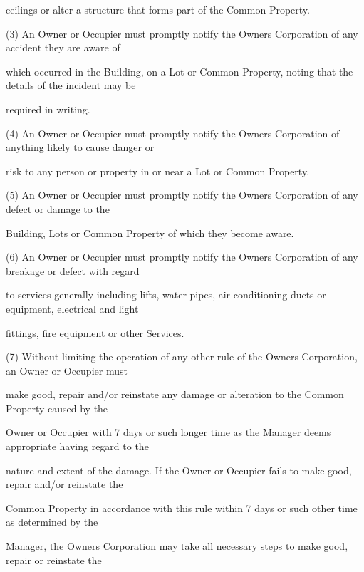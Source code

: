 \documentclass{article}
\begin{document}
{\fontsize{10.02}{1}ceilings or alter a structure that forms part of the Common Property. }

\newpage

{\fontsize{9.962}{1}(3) An Owner or Occupier must promptly notify the Owners Corporation of any accident they are aware of }

{\fontsize{10.02}{1}which occurred in the Building, on a Lot or Common Property, noting that the details of the incident may be }

{\fontsize{10.02}{1}required in writing. }

{\fontsize{9.962}{1}(4) An Owner or Occupier must promptly notify the Owners Corporation of anything likely to cause danger or }

{\fontsize{10.02}{1}risk to any person or property in or near a Lot or Common Property. }

{\fontsize{9.962}{1}(5) An Owner or Occupier must promptly notify the Owners Corporation of any defect or damage to the }

{\fontsize{10.02}{1}Building, Lots or Common Property of which they become aware. }

{\fontsize{9.962}{1}(6) An Owner or Occupier must promptly notify the Owners Corporation of any breakage or defect with regard }

{\fontsize{10.02}{1}to services generally including lifts, water pipes, air conditioning ducts or equipment, electrical and light }

{\fontsize{10.02}{1}fittings, fire equipment or other Services. }

{\fontsize{9.962}{1}(7) Without limiting the operation of any other rule of the Owners Corporation, an Owner or Occupier must }

{\fontsize{10.02}{1}make good, repair and/or reinstate any damage or alteration to the Common Property caused by the }

{\fontsize{10.02}{1}Owner or Occupier with 7 days or such longer time as the Manager deems appropriate having regard to the }

{\fontsize{10.02}{1}nature and extent of the damage. If the Owner or Occupier fails to make good, repair and/or reinstate the }

{\fontsize{10.02}{1}Common Property in accordance with this rule within 7 days or such other time as determined by the }

{\fontsize{10.02}{1}Manager, the Owners Corporation may take all necessary steps to make good, repair or reinstate the }
\end{document}
